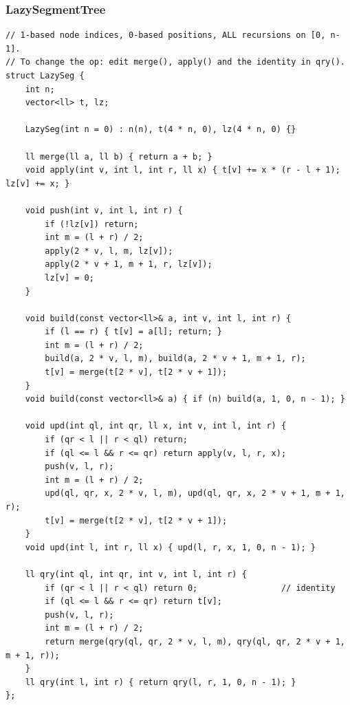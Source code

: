 \documentclass[9pt,a4paper,twocolumn]{extarticle}
\begin{document}
\filbreak
\subsubsection{LazySegmentTree}
\nopagebreak
\begin{lstlisting}
// 1-based node indices, 0-based positions, ALL recursions on [0, n-1].
// To change the op: edit merge(), apply() and the identity in qry().
struct LazySeg {
    int n;
    vector<ll> t, lz;

    LazySeg(int n = 0) : n(n), t(4 * n, 0), lz(4 * n, 0) {}

    ll merge(ll a, ll b) { return a + b; }
    void apply(int v, int l, int r, ll x) { t[v] += x * (r - l + 1); lz[v] += x; }

    void push(int v, int l, int r) {
        if (!lz[v]) return;
        int m = (l + r) / 2;
        apply(2 * v, l, m, lz[v]);
        apply(2 * v + 1, m + 1, r, lz[v]);
        lz[v] = 0;
    }

    void build(const vector<ll>& a, int v, int l, int r) {
        if (l == r) { t[v] = a[l]; return; }
        int m = (l + r) / 2;
        build(a, 2 * v, l, m), build(a, 2 * v + 1, m + 1, r);
        t[v] = merge(t[2 * v], t[2 * v + 1]);
    }
    void build(const vector<ll>& a) { if (n) build(a, 1, 0, n - 1); }

    void upd(int ql, int qr, ll x, int v, int l, int r) {
        if (qr < l || r < ql) return;
        if (ql <= l && r <= qr) return apply(v, l, r, x);
        push(v, l, r);
        int m = (l + r) / 2;
        upd(ql, qr, x, 2 * v, l, m), upd(ql, qr, x, 2 * v + 1, m + 1, r);
        t[v] = merge(t[2 * v], t[2 * v + 1]);
    }
    void upd(int l, int r, ll x) { upd(l, r, x, 1, 0, n - 1); }

    ll qry(int ql, int qr, int v, int l, int r) {
        if (qr < l || r < ql) return 0;                 // identity
        if (ql <= l && r <= qr) return t[v];
        push(v, l, r);
        int m = (l + r) / 2;
        return merge(qry(ql, qr, 2 * v, l, m), qry(ql, qr, 2 * v + 1, m + 1, r));
    }
    ll qry(int l, int r) { return qry(l, r, 1, 0, n - 1); }
};
\end{lstlisting}

\filbreak
\end{document}

